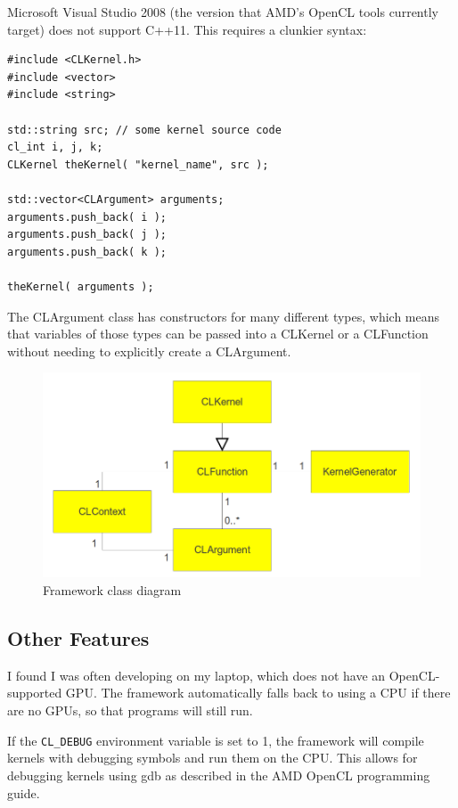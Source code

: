 \documentclass{article}
\begin{document}
Microsoft Visual Studio 2008 (the version that AMD's OpenCL tools currently target) does not support C++11. This requires a clunkier syntax:

\begin{lstlisting}
#include <CLKernel.h>
#include <vector>
#include <string>

std::string src; // some kernel source code
cl_int i, j, k;
CLKernel theKernel( "kernel_name", src );

std::vector<CLArgument> arguments;
arguments.push_back( i ); 
arguments.push_back( j ); 
arguments.push_back( k ); 

theKernel( arguments );
\end{lstlisting}

The CLArgument class has constructors for many different types, which means that variables of those types can be passed into a CLKernel or a CLFunction without needing to explicitly create a CLArgument.

\begin{figure}[ht!]
\centering
\includegraphics[width=120mm]{class-diagram.png}
\caption{Framework class diagram}
\label{fig:classdiagram}
\end{figure}

\subsection{Other Features}
I found I was often developing on my laptop, which does not have an OpenCL-supported GPU. The framework automatically falls back to using a CPU if there are no GPUs, so that programs will still run.

If the \texttt{CL\_DEBUG} environment variable is set to 1, the framework will compile kernels with debugging symbols and run them on the CPU. This allows for debugging kernels using gdb as described in the AMD OpenCL programming guide\cite{amdapp}.
\end{document}
